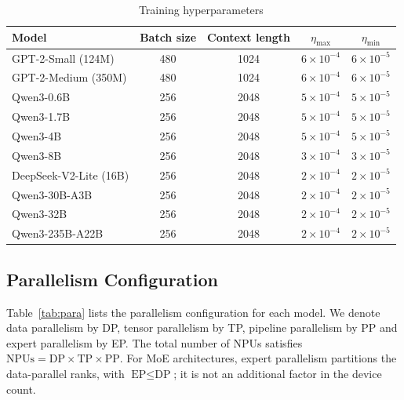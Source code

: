 \documentclass{article}
\begin{document}
\begin{table}[!htbp]
    \centering
    \small        
    
    \begin{tabular}{l c c c c}
        \toprule
        {Model}  & Batch size & Context length & $\eta_{\max}$ & $\eta_{\min}$ \\
        \midrule
        GPT-2-Small (124M) & 480 & 1024 & $\text{6}\times \text{10}^{-\text{4}}$ & $\text{6}\times \text{10}^{-\text{5}}$ \\
        GPT-2-Medium (350M) & 480 & 1024& $\text{6}\times \text{10}^{-\text{4}}$ & $\text{6}\times \text{10}^{-\text{5}}$ \\
        Qwen3-0.6B & 256 & 2048 & $\text{5}\times \text{10}^{-\text{4}}$ & $\text{5}\times \text{10}^{-\text{5}}$ \\
        Qwen3-1.7B & 256 & 2048& $\text{5}\times \text{10}^{-\text{4}}$ & $\text{5}\times \text{10}^{-\text{5}}$ \\
        Qwen3-4B & 256 & 2048& $\text{5}\times \text{10}^{-\text{4}}$ & $\text{5}\times \text{10}^{-\text{5}}$ \\
        Qwen3-8B & 256 & 2048& $\text{3}\times \text{10}^{-\text{4}}$ & $\text{3}\times \text{10}^{-\text{5}}$ \\
        DeepSeek-V2-Lite (16B) & 256 & 2048& $\text{2}\times \text{10}^{-\text{4}}$ & $\text{2}\times \text{10}^{-\text{5}}$ \\
        Qwen3-30B-A3B & 256 & 2048   & $\text{2}\times \text{10}^{-\text{4}}$ & $\text{2}\times \text{10}^{-\text{5}}$ \\
        Qwen3-32B   & 256 & 2048    & $\text{2}\times \text{10}^{-\text{4}}$ & $\text{2}\times \text{10}^{-\text{5}}$ \\
        Qwen3-235B-A22B & 256 & 2048 & $\text{2}\times \text{10}^{-\text{4}}$ & $\text{2}\times \text{10}^{-\text{5}}$ \\
        \bottomrule
    \end{tabular}
\caption{Training hyperparameters}
    \label{tab:lr}
    
\end{table}

\subsection{Parallelism Configuration}

Table~\ref{tab:para} lists the parallelism configuration for each model. We denote data parallelism by DP, tensor parallelism by TP, pipeline parallelism by PP and expert parallelism by EP. The total number of NPUs satisfies $\text{NPUs} = \text{DP} \times \text{TP} \times \text{PP}$. For MoE architectures, expert parallelism partitions the data-parallel ranks, with $\text{EP} \leq \text{DP}$; it is not an additional factor in the device count.
\end{document}
